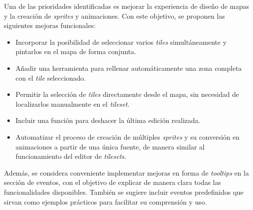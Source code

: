 \smallskip 

Una de las prioridades identificadas es mejorar la experiencia de diseño de mapas y la creación de \textit{sprites} y animaciones. Con este objetivo, se proponen las siguientes mejoras funcionales:

\begin{itemize}
	\item Incorporar la posibilidad de seleccionar varios \textit{tiles} simultáneamente y pintarlos en el mapa de forma conjunta. 

	\item Añadir una herramienta para rellenar automáticamente una zona completa con el \textit{tile} seleccionado. 

	\item Permitir la selección de \textit{tiles} directamente desde el mapa, sin necesidad de localizarlos manualmente en el \textit{tileset}. 

	\item Incluir una función para deshacer la última edición realizada. 

	\item Automatizar el proceso de creación de múltiples \textit{sprites} y su conversión en animaciones a partir de una única fuente, de manera similar al funcionamiento del editor de \textit{tilesets}. 
\end{itemize}

Además, se considera conveniente implementar mejoras en forma de \textit{tooltips} en la sección de eventos, con el objetivo de explicar de manera clara todas las funcionalidades disponibles. También se sugiere incluir eventos predefinidos que sirvan como ejemplos prácticos para facilitar su comprensión y uso.

